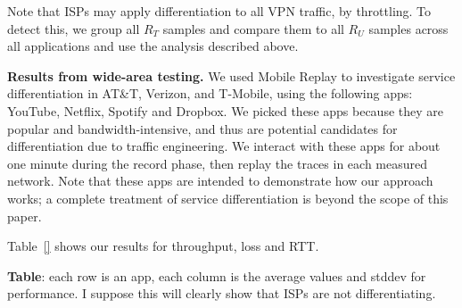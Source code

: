 Note that ISPs may apply differentiation to all VPN traffic, \eg by throttling. To detect this, we group all $R_T$ 
samples and compare them to all $R_U$ samples across all applications and use the analysis described above. 


\noindent\textbf{Results from wide-area testing.} We used Mobile Replay to investigate service differentiation in 
AT\&T, Verizon, and T-Mobile, using the following apps: YouTube, Netflix, Spotify and Dropbox. 
We picked these apps because they are popular and bandwidth-intensive, and thus are potential candidates 
for differentiation due to traffic engineering. We interact with these apps for about one minute during the record 
phase, then replay the traces in each measured network. Note that these apps are intended to demonstrate 
how our approach works; a complete treatment of service differentiation is beyond the scope of this paper. 

Table~\ref{} shows our results for throughput, loss and RTT.     
 
\textbf{Table}: each row is an app, each column is the average values and stddev for performance. I suppose 
this will clearly show that ISPs are not differentiating.
 

%


